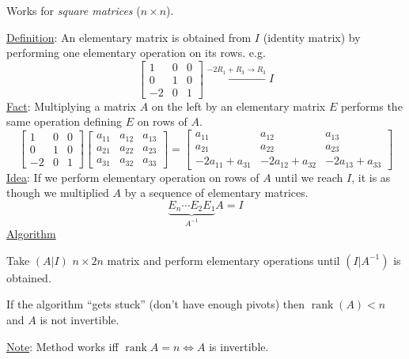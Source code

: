 \documentclass{article}
\newcommand{\tmem}[1]{{\em #1\/}}
\newcommand{\tmop}[1]{\ensuremath{\operatorname{#1}}}
\begin{document}
Works for {\tmem{square matrices}} ($n \times n$).

{\underline{Definition}}: An elementary matrix is obtained from $I$ (identity
matrix) by performing one elementary operation on its rows. e.g.
\[ \left[\begin{array}{ccc}
     1 & 0 & 0\\
     0 & 1 & 0\\
     - 2 & 0 & 1
   \end{array}\right] \xleftarrow{- 2 R_1 + R_3 \rightarrow R_3} I \]
{\underline{Fact}}: Multiplying a matrix $A$ on the left by an elementary
matrix $E$ performs the same operation defining $E$ on rows of $A$.
\[ \left[\begin{array}{ccc}
     1 & 0 & 0\\
     0 & 1 & 0\\
     - 2 & 0 & 1
   \end{array}\right] \left[\begin{array}{ccc}
     a_{11} & a_{12} & a_{13}\\
     a_{21} & a_{22} & a_{23}\\
     a_{31} & a_{32} & a_{33}
   \end{array}\right] = \left[\begin{array}{ccc}
     a_{11} & a_{12} & a_{13}\\
     a_{21} & a_{22} & a_{23}\\
     - 2 a_{11} + a_{31} & - 2 a_{12} + a_{32} & - 2 a_{13} + a_{33}
   \end{array}\right] \]
{\underline{Idea}}: If we perform elementary operation on rows of $A$ until we
reach $I$, it is as though we multiplied $A$ by a sequence of elementary
matrices.
\[ \underbrace{E_n \cdots E_2 E_1}_{A^{- 1}} A = I \]
{\underline{Algorithm}}

Take $(A|I)$ $n \times 2 n$ matrix and perform elementary operations until $
(I|A^{- 1})$ is obtained.

If the algorithm ``gets stuck'' (don't have enough pivots) then $\tmop{rank}
(A) < n$ and $A$ is not invertible.

{\underline{Note}}: Method works iff $\tmop{rank} A = n \Longleftrightarrow A$
is invertible.
\end{document}
